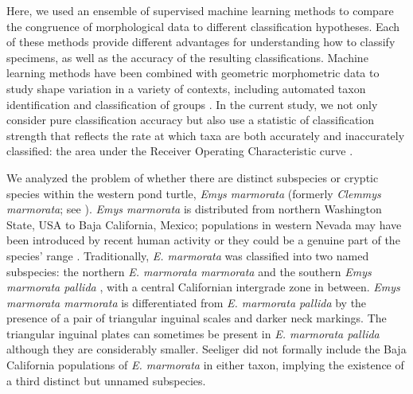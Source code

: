 \documentclass[10pt,letterpaper]{article}
\begin{document}
Here, we used an ensemble of supervised machine learning methods to compare the congruence of morphological data to different classification hypotheses. Each of these methods provide different advantages for understanding how to classify specimens, as well as the accuracy of the resulting classifications. 
Machine learning methods have been combined with geometric morphometric data to study shape variation in a variety of contexts, including automated taxon identification and classification of groups \cite{Baylac2003,Dobigny2003,MacLeod2007,VanBocxlaer2010,VandenBrink2011,Navega2015}. %
In the current study, we not only consider pure classification accuracy but also use a statistic of classification strength that reflects the rate at which taxa are both accurately and inaccurately classified: the area under the Receiver Operating Characteristic curve \cite{Hastie2009}. 

We analyzed the problem of whether there are distinct subspecies or cryptic species within the western pond turtle, \textit{Emys marmorata} \cite{Baird1852} (formerly \emph{Clemmys marmorata}; see \cite{Feldman2002}). \textit{Emys marmorata} is distributed from northern Washington State, USA to Baja California, Mexico; populations in western Nevada may have been introduced by recent human activity or they could be a genuine part of the species' range \cite{Bury2017}. Traditionally, \textit{E. marmorata} was classified into two named subspecies: the northern \textit{E. marmorata marmorata} and the southern \textit{Emys marmorata pallida} \cite{Seeliger1945}, with a central Californian intergrade zone in between. \textit{Emys marmorata marmorata} is differentiated from \textit{E. marmorata pallida} by the presence of a pair of triangular inguinal scales and darker neck markings. The triangular inguinal plates can sometimes be present in \textit{E. marmorata pallida} although they are considerably smaller. Seeliger \cite{Seeliger1945} did not formally include the Baja California populations of \textit{E. marmorata} in either taxon, implying the existence of a third distinct but unnamed subspecies.
\end{document}
